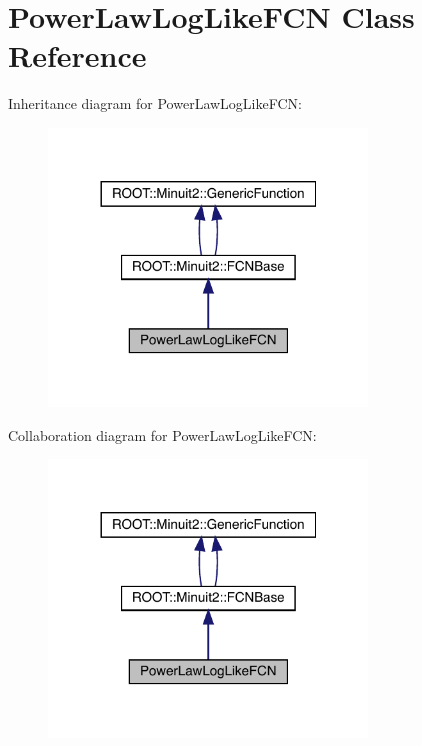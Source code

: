\hypertarget{classPowerLawLogLikeFCN}{}\section{Power\+Law\+Log\+Like\+F\+CN Class Reference}
\label{classPowerLawLogLikeFCN}


Inheritance diagram for Power\+Law\+Log\+Like\+F\+CN\+:\nopagebreak
\begin{figure}[H]
\begin{center}
\leavevmode
\includegraphics[width=240pt]{dc/ddc/classPowerLawLogLikeFCN__inherit__graph}
\end{center}
\end{figure}


Collaboration diagram for Power\+Law\+Log\+Like\+F\+CN\+:\nopagebreak
\begin{figure}[H]
\begin{center}
\leavevmode
\includegraphics[width=240pt]{db/dba/classPowerLawLogLikeFCN__coll__graph}
\end{center}
\end{figure}
